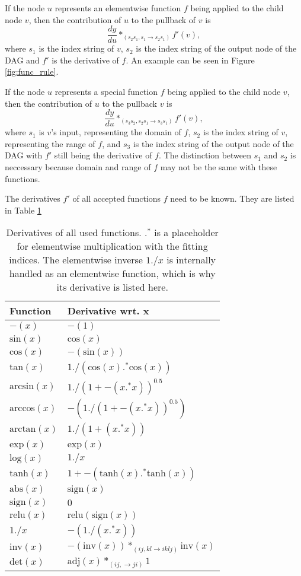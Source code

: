 \documentclass[12pt, a4paper]{report}
\begin{document}
If the node $u$ represents an elementwise function $f$ being applied to the child node $v$, then the contribution of $u$ to the pullback of $v$ is 
$$
\frac{dy}{du} *_{(s_2s_1,s_1 \rightarrow s_2s_1)} f'(v),
$$
where $s_1$ is the index string of $v$, $s_2$ is the index string of the output node of the DAG and $f'$ is the derivative of $f$.
An example can be seen in Figure \ref{fig:func_rule}.

If the node $u$ represents a special function $f$ being applied to the child node $v$, then the contribution of $u$ to the pullback $v$ is
$$
\frac{dy}{du} *_{(s_3s_2,s_2s_1 \rightarrow s_3s_1)} f'(v),
$$
where $s_1$ is $v$'s input, representing the domain of $f$, $s_2$ is the index string of $v$, representing the range of $f$, and $s_3$ is the index string of the output node of the DAG with $f'$ still being the derivative of $f$.
The distinction between $s_1$ and $s_2$ is neccessary because domain and range of $f$ may not be the same with these functions.

The derivatives $f'$ of all accepted functions $f$ need to be known.
They are listed in Table \ref{tab:func_diffs}
\begin{table}[ht]
    \centering
    \begin{tabular}{l | l}
        Function & Derivative wrt. x \\\hline
        $-(x)$ & $-(1)$ \\
        $\text{sin}(x)$ & $\text{cos}(x)$ \\
        $\text{cos}(x)$ & $-(\text{sin}(x))$ \\
        $\text{tan}(x)$ & $1 ./ (\text{cos}(x) .^* \text{cos}(x))$ \\
        $\text{arcsin}(x)$ & $1 ./ (1 + -(x .^* x))^{0.5}$ \\
        $\text{arccos}(x)$ & $-(1 ./ (1 + -(x .^* x))^{0.5})$ \\
        $\text{arctan}(x)$ & $1 ./ (1 + (x .^* x))$ \\
        $\text{exp}(x)$ & $\text{exp}(x)$ \\
        $\text{log}(x)$ & $1 ./ x$ \\
        $\text{tanh}(x)$ & $1 + -(\text{tanh}(x) .^* \text{tanh}(x))$ \\
        $\text{abs}(x)$ & $\text{sign}(x)$ \\
        $\text{sign}(x)$ & $0$ \\
        $\text{relu}(x)$ & $\text{relu}(\text{sign}(x))$ \\
        $1 ./ x$ & $- (1 ./ (x .^* x))$ \\
        $\text{inv}(x)$ & $-(\text{inv}(x)) *_{(ij,kl \rightarrow iklj)} \text{inv}(x)$ \\
        $\text{det}(x)$ & $\text{adj}(x) *_{(ij, \rightarrow ji)} 1$ \\
    \end{tabular}
    \caption{Derivatives of all used functions. $.^*$ is a placeholder for elementwise multiplication with the fitting indices. The elementwise inverse $1 ./ x$ is internally handled as an elementwise function, which is why its derivative is listed here.} %
    \label{tab:func_diffs}
\end{table}
\end{document}
